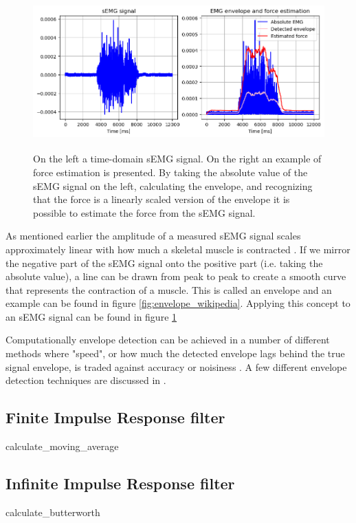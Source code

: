 \begin{figure}[h!t]
	\begin{center}
		\includegraphics[height=60mm]{images/amplitude_force_estimation_example.png}
	\end{center}
	\caption{On the left a time-domain sEMG signal. On the right an example of force estimation is presented. By taking the absolute value of the sEMG signal on the left, calculating the envelope, and recognizing that the force is a linearly scaled version of the envelope it is possible to estimate the force from the sEMG signal.}
	\label{fig:amplitude_estimation_example}
\end{figure}

As mentioned earlier the amplitude of a measured sEMG signal scales approximately linear with how much a skeletal muscle is contracted \cite{adaptive_filter_dry_electrode}. If we mirror the negative part of the sEMG signal onto the positive part (i.e. taking the absolute value), a line can be drawn from peak to peak to create a smooth curve that represents the contraction of a muscle. This is called an envelope and an example can be found in figure \ref{fig:envelope_wikipedia}. Applying this concept to an sEMG signal can be found in figure \ref{fig:amplitude_estimation_example}

Computationally envelope detection can be achieved in a number of different methods where "speed", or how much the detected envelope lags behind the true signal envelope, is traded against accuracy or noisiness \cite{dsp_good_bad_ugly}. A few different envelope detection techniques are discussed in \cite{rose2011electromyogram}.

\subsection{Finite Impulse Response filter}
calculate_moving_average

\subsection{Infinite Impulse Response filter}
calculate_butterworth

